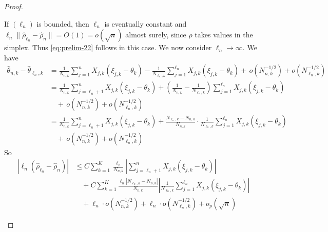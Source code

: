 \begin{proof}
\begin{enumerate}[label=(\roman*)]
If $(\ell_n)$ is bounded, then $\ell_n$ is eventually constant and
        $\ell_n\|\hat\rho_{\ell_n}-\hat\rho_n\|=O(1)=o(\sqrt n)$ almost surely, since $\rho$ takes values in the simplex. Thus \eqref{eq:prelim-22} follows in this case. We now consider $\ell_n\to\infty$. We have	
		\begin{align*}
			\hat{\theta}_{n,k}-\hat{\theta}_{\ell_n,k} &= \frac{1}{N_{n,k}}\sum_{j=1}^{n}X_{j,k}(\xi_{j,k}-\theta_k)-\frac{1}{N_{\ell_n,k}}\sum_{j=1}^{\ell_n}X_{j,k}(\xi_{j,k}-\theta_k) +\,o\left(N_{n,k}^{-1/2}\right)+o\left(N_{\ell_n,k}^{-1/2}\right)\\
			&= \frac{1}{N_{n,k}}\sum_{j=\ell_n+1}^{n} X_{j,k}(\xi_{j,k}-\theta_k) + \left(\frac{1}{N_{n,k}} - \frac{1}{N_{\ell_n,k}}\right)\sum_{j=1}^{\ell_n}X_{j,k}(\xi_{j,k}-\theta_k)\\ &\quad +\, o\left(N_{n,k}^{-1/2}\right)+o\left(N_{\ell_n,k}^{-1/2}\right)\\
			&= \frac{1}{N_{n,k}}\sum_{j=\ell_n+1}^{n}X_{j,k}(\xi_{j,k}-\theta_k) + \frac{N_{\ell_n,k}-N_{n,k}}{N_{n,k}}\cdot\frac{1}{N_{\ell_n,k}}\sum_{j=1}^{\ell_n}X_{j,k}(\xi_{j,k}-\theta_k)\\
			&\quad +\, o\left(N_{n,k}^{-1/2}\right) + o\left(N_{\ell_n,k}^{-1/2}\right)
		\end{align*}
		So
		\begin{align*}
			|\ell_n(\hat{\rho}_{\ell_n}-\hat{\rho}_n)| &\le C\sum_{k=1}^{K}\frac{\ell_n}{N_{n,k}}\left|\sum_{j=\ell_n+1}^{n}X_{j,k}(\xi_{j,k}-\theta_k)\right|\\
			&\quad + C\sum_{k=1}^{K}\frac{\ell_n|N_{\ell_n,k}-N_{n,k}|}{N_{n,k}}\left|\frac{1}{N_{\ell_n,k}}\sum_{j=1}^{\ell_n}X_{j,k}(\xi_{j,k}-\theta_k)\right|\\
			&\quad + \ell_n \cdot o\left(N_{n,k}^{-1/2}\right) + \ell_n \cdot o\left(N_{\ell_n,k}^{-1/2}\right) + o_p(\sqrt n)
		\end{align*}
		


\end{enumerate}
\end{proof}
